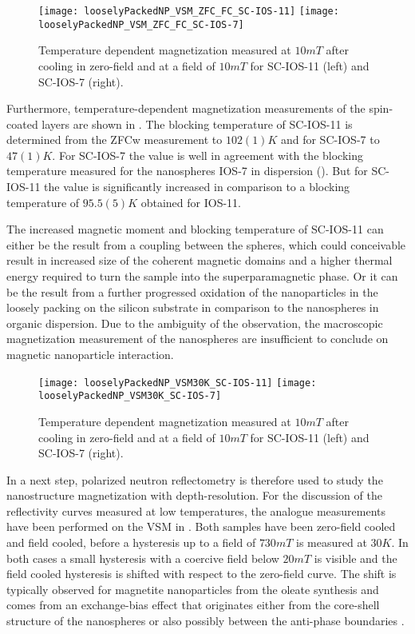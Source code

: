 \documentclass[\main/dresen_thesis.tex]{subfiles}
\begin{document}
  \begin{figure}[tb]
    \centering
    \texttt{[image: looselyPackedNP\_VSM\_ZFC\_FC\_SC-IOS-11]}
    \texttt{[image: looselyPackedNP\_VSM\_ZFC\_FC\_SC-IOS-7]}
    \caption{\label{fig:looselyPackedNP:layer:vsmZFCFC}Temperature dependent magnetization measured at $10 \unit{mT}$ after cooling in zero-field and at a field of $10 \unit{mT}$ for SC-IOS-11 (left) and SC-IOS-7 (right).}
  \end{figure}

  Furthermore, temperature-dependent magnetization measurements of the spin-coated layers are shown in .
  The blocking temperature of SC-IOS-11 is determined from the ZFCw measurement to $102(1) \unit{K}$ and for SC-IOS-7 to $47(1) \unit{K}$.
  For SC-IOS-7 the value is well in agreement with the blocking temperature measured for the nanospheres IOS-7 in dispersion ().
  But for SC-IOS-11 the value is significantly increased in comparison to a blocking temperature of $95.5(5) \unit{K}$ obtained for IOS-11.

  The increased magnetic moment and blocking temperature of SC-IOS-11 can either be the result from a coupling between the spheres, which could conceivable result in increased size of the coherent magnetic domains and a higher thermal energy required to turn the sample into the superparamagnetic phase.
  Or it can be the result from a further progressed oxidation of the nanoparticles in the loosely packing on the silicon substrate in comparison to the nanospheres in organic dispersion.
  Due to the ambiguity of the observation, the macroscopic magnetization measurement of the nanospheres are insufficient to conclude on magnetic nanoparticle interaction.

  \begin{figure}[tb]
    \centering
    \texttt{[image: looselyPackedNP\_VSM30K\_SC-IOS-11]}
    \texttt{[image: looselyPackedNP\_VSM30K\_SC-IOS-7]}
    \caption{\label{fig:looselyPackedNP:layer:vsm30K}Temperature dependent magnetization measured at $10 \unit{mT}$ after cooling in zero-field and at a field of $10 \unit{mT}$ for SC-IOS-11 (left) and SC-IOS-7 (right).}
  \end{figure}
  In a next step, polarized neutron reflectometry is therefore used to study the nanostructure magnetization with depth-resolution.
  For the discussion of the reflectivity curves measured at low temperatures, the analogue measurements have been performed on the VSM in .
  Both samples have been zero-field cooled and field cooled, before a hysteresis up to a field of $730 \unit{mT}$ is measured at $30 \unit{K}$.
  In both cases a small hysteresis with a coercive field below $20 \unit{mT}$ is visible and the field cooled hysteresis is shifted with respect to the zero-field curve.
  The shift is typically observed for magnetite nanoparticles from the oleate synthesis and comes from an exchange-bias effect that originates either from the core-shell structure of the nanospheres or also possibly between the anti-phase boundaries \cite{Wetterskog_2013_Anoma}.
\end{document}
